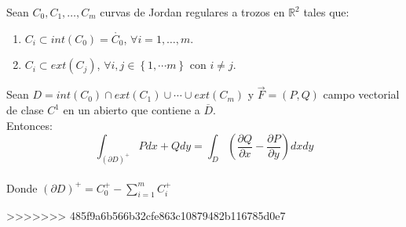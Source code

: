 \begin{teorema}
    Sean $C_0, C_1, \ldots, C_m$ curvas de Jordan regulares a trozos en $\mathbb{R}^2$ tales que:\\
    \begin{enumerate}
        \item $C_i \subset int(C_0) = \mathring{C_0}$, $\forall i = 1, \ldots, m$.
        \item $C_i \subset ext(C_j)$, $\forall i, j \in \left\{1, \cdots m\right\}$ con $i \neq j$.
    \end{enumerate}
    Sean $D=int(C_0) \cap ext(C_1) \cup \cdots \cup ext(C_m)$ y $\vec{F} = (P,Q)$ campo vectorial de clase $C^1$ en un abierto que contiene a $\overline{D}$.\\
    Entonces:
    $$\int_{\left(\partial D\right)^+} Pdx + Qdy = \int_{D} \left(\frac{\partial Q}{\partial x} - \frac{\partial P}{\partial y}\right) dxdy$$\\
    Donde $\left(\partial D\right)^+ = C_0^+ - \sum_{i=1}^{m} C_i^+$\\
\end{teorema}
>>>>>>> 485f9a6b566b32cfe863c10879482b116785d0e7
